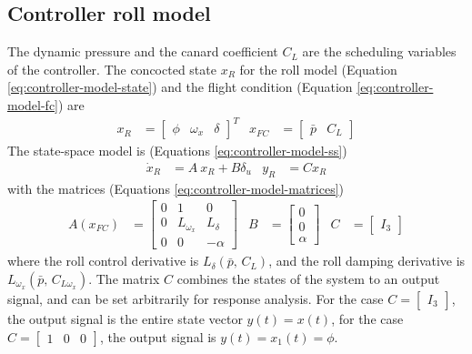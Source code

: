 \subsection{Controller roll model}
\label{sec:controller_model}
The dynamic pressure and the canard coefficient $C_L$ are the scheduling variables of the controller.
The concocted state $x_R$ for the roll model (Equation \ref{eq:controller-model-state}) and the flight condition (Equation \ref{eq:controller-model-fc}) are
\begin{align}
    x_R &= \begin{bmatrix} \phi & \omega_x & \delta \end{bmatrix}^T 
    & 
    x_{FC} &= \begin{bmatrix} \bar p & C_L \end{bmatrix}
    \nonumber
\end{align}
The state-space model is (Equations \ref{eq:controller-model-ss})
\begin{align}
    \dot x_R &= A \: x_R + B \delta_u 
    &
    y_R &= C x_R
    \nonumber
\end{align}
with the matrices (Equations \ref{eq:controller-model-matrices})
\begin{align}    
    A(x_{FC}) &= \begin{bmatrix}
        0 & 1 & 0 \\
        0 & L_{\omega_x} & L_\delta \\
        0 & 0 & -\alpha
    \end{bmatrix}
    &
    B &= \begin{bmatrix}
        0 \\ 0 \\ \alpha
    \end{bmatrix}
    &
    C &= \begin{bmatrix} I_3 \end{bmatrix}
    \nonumber
\end{align}
where the roll control derivative is $L_\delta (\bar p,  \,  C_L)$, and the roll damping derivative is $L_{\omega_x} (\bar p, \, C_{L \omega_x})$.
The matrix $C$ combines the states of the system to an output signal, and can be set arbitrarily for response analysis.
For the case $C = \begin{bmatrix} I_3 \end{bmatrix}$, the output signal is the entire state vector $y(t) = x(t)$, for the case $C = \begin{bmatrix} 1 & 0 & 0 \end{bmatrix}$, the output signal is $y(t) = x_1(t) = \phi$.

